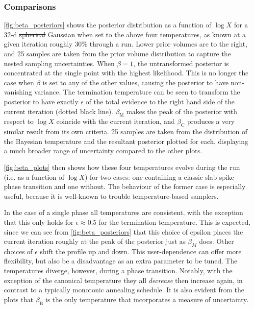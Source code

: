 \documentclass[usenatbib]{mnras}
\providecommand{\DIFaddtex}[1]{{\protect\color{blue}\uwave{#1}}} %
\providecommand{\DIFdeltex}[1]{{\protect\color{red}\sout{#1}}}                      %
\providecommand{\DIFaddbegin}{} %
\providecommand{\DIFaddend}{} %
\providecommand{\DIFdelbegin}{} %
\providecommand{\DIFdelend}{} %
\providecommand{\DIFadd}[1]{\texorpdfstring{\DIFaddtex{#1}}{#1}} %
\providecommand{\DIFdel}[1]{\texorpdfstring{\DIFdeltex{#1}}{}} %
\newcommand{\DIFscaledelfig}{0.5}
\newlength{\DIFdelgraphicswidth} %
\newlength{\DIFdelgraphicsheight} %
\newcommand{\DIFaddincludegraphics}[2][]{{\color{blue}\fbox{\DIFOincludegraphics[#1]{#2}}}} %
\newcommand{\DIFdelincludegraphics}[2][]{%
\sbox{\DIFdelgraphicsbox}{\DIFOincludegraphics[#1]{#2}}%
\settoboxwidth{\DIFdelgraphicswidth}{\DIFdelgraphicsbox} %
\settoboxtotalheight{\DIFdelgraphicsheight}{\DIFdelgraphicsbox} %
\scalebox{\DIFscaledelfig}{%
\parbox[b]{\DIFdelgraphicswidth}{\usebox{\DIFdelgraphicsbox}\\[-\baselineskip] \rule{\DIFdelgraphicswidth}{0em}}\llap{\resizebox{\DIFdelgraphicswidth}{\DIFdelgraphicsheight}{%
\setlength{\unitlength}{\DIFdelgraphicswidth}%
\begin{picture}(1,1)%
\thicklines\linethickness{2pt} %
{\color[rgb]{1,0,0}\put(0,0){\framebox(1,1){}}}%
{\color[rgb]{1,0,0}\put(0,0){\line( 1,1){1}}}%
{\color[rgb]{1,0,0}\put(0,1){\line(1,-1){1}}}%
\end{picture}%
}\hspace*{3pt}}} %
} %
\DeclareRobustCommand{\DIFaddbegin}{\DIFOaddbegin \let\includegraphics\DIFaddincludegraphics} %
\DeclareRobustCommand{\DIFaddend}{\DIFOaddend \let\includegraphics\DIFOincludegraphics} %
\DeclareRobustCommand{\DIFdelbegin}{\DIFOdelbegin \let\includegraphics\DIFdelincludegraphics} %
\DeclareRobustCommand{\DIFdelend}{\DIFOaddend \let\includegraphics\DIFOincludegraphics} %
\begin{document}
\subsubsection*{Comparisons}
\cref{fig:beta_posteriors} shows the posterior distribution as a function of $\log X$ for a 32-d \DIFdelbegin \DIFdel{spherical }\DIFdelend \DIFaddbegin \DIFadd{isotropic }\DIFaddend Gaussian when set to the above four temperatures, as known at a given iteration roughly 30\% through a run. Lower prior volumes are to the right, and 25 samples are taken from the prior volume distribution to capture the nested sampling uncertainties. When $\beta = 1$, the untransformed posterior is concentrated at the single point with the highest likelihood. This is no longer the case when $\beta$ is set to any of the other values, causing the posterior to have non-vanishing variance. The termination temperature can be seen to transform the posterior to have exactly $\epsilon$ of the total evidence to the right hand side of the current iteration (dotted black line). $\beta_\mathrm{M}$ makes the peak of the posterior with respect to $\log X$ coincide with the current iteration, and $\beta_\mathrm{C}$ produces a very similar result from its own criteria. 25 samples are taken from the distribution of the Bayesian temperature and the resultant posterior plotted for each, displaying a much broader range of uncertainty compared to the other plots.
\par
\cref{fig:beta_plots} then shows how these four temperatures evolve during the run (i.e. as a function of $\log X$) for two cases: one containing a classic slab-spike phase transition and one without. The behaviour of the former case is especially useful, because it is well-known to trouble temperature-based samplers. 
\par
In the case of a single phase all temperatures are consistent, with the exception that this only holds for $\epsilon \approx 0.5$ for the termination temperature. This is expected, since we can see from \cref{fig:beta_posteriors} that this choice of epsilon places the current iteration roughly at the peak of the posterior just as $\beta_M$ does. Other choices of $\epsilon$ shift the profile up and down. This user-dependence can offer more flexibility, but also be a disadvantage as an extra parameter to be tuned. The temperatures diverge, however, during a phase transition. Notably, with the exception of the canonical temperature they all \textit{decrease} then increase again, in contrast to a typically monotonic annealing schedule. It is also evident from the plots that $\beta_\mathrm{B}$ is the only temperature that incorporates a measure of uncertainty.
\end{document}
